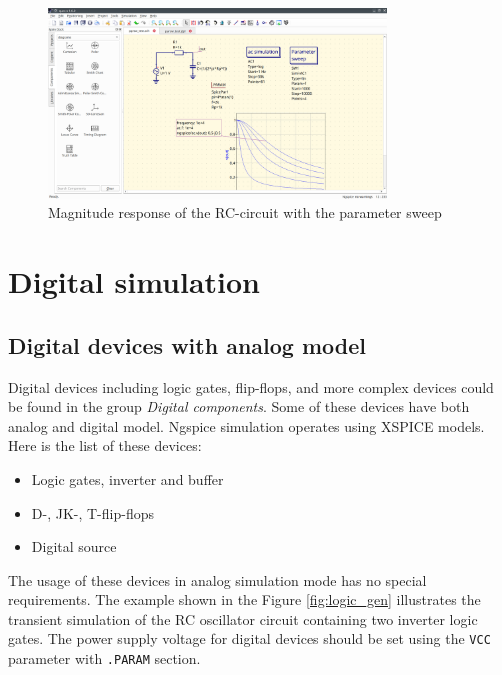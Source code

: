\documentclass[a4paper,12pt]{article}
\begin{document}
        \begin{figure}[!ht]
        \begin{center}
            \includegraphics[width=0.8\textwidth]{img/rc_parsw_var.png}
        \end{center}
        \caption{Magnitude response of the RC-circuit with the parameter sweep} 
    \label{fig:rc_parsw_var}
    \end{figure}
    
\section{Digital simulation}

\subsection{Digital devices with analog model}

Digital devices including logic gates, flip-flops, and more complex devices could be found in the group \emph{Digital components}. Some of these devices have both analog and digital model. Ngspice simulation operates using XSPICE models. Here is the list of these devices:

\begin{itemize}
 \item Logic gates, inverter and buffer
 \item D-, JK-, T-flip-flops
 \item Digital source
\end{itemize}

The usage of these devices in analog simulation mode has no special requirements. The example shown in the Figure \ref{fig:logic_gen} illustrates the transient simulation of the RC oscillator circuit containing two inverter logic gates. The power supply voltage for digital devices should be set using the \verb|VCC| parameter with \verb|.PARAM| section.
\end{document}
